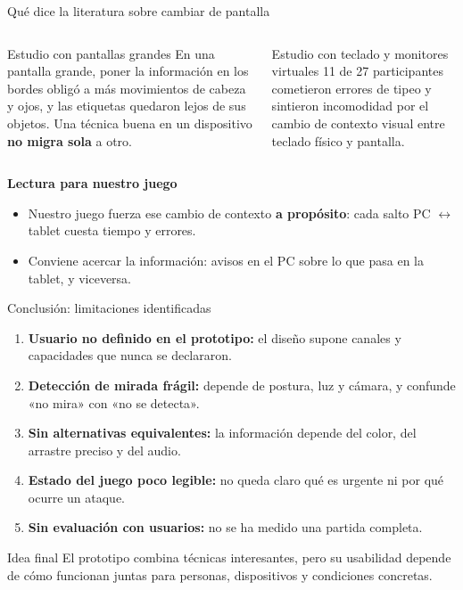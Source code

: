 \documentclass[aspectratio=169,11pt]{beamer}
\newcommand{\tagline}[1]{{\color{Teal}\bfseries\small #1}}
\newcommand{\strong}[1]{{\color{Navy}\bfseries #1}}
\begin{document}
\begin{frame}{Qué dice la literatura sobre cambiar de pantalla}
  \begin{columns}[T,onlytextwidth]
      \begin{block}{Estudio con pantallas grandes}
        \small
        En una pantalla grande, poner la información en los bordes obligó a más movimientos de cabeza y ojos, y las etiquetas quedaron lejos de sus objetos. Una técnica buena en un dispositivo \strong{no migra sola} a otro.
      \end{block}
      \begin{block}{Estudio con teclado y monitores virtuales}
        \small
        11 de 27 participantes cometieron errores de tipeo y sintieron incomodidad por el cambio de contexto visual entre teclado físico y pantalla.
      \end{block}
  \end{columns}
  \vspace{.5em}
  \tagline{Lectura para nuestro juego}
  \begin{itemize}
    \item Nuestro juego fuerza ese cambio de contexto \strong{a propósito}: cada salto PC $\leftrightarrow$ tablet cuesta tiempo y errores.
    \item Conviene acercar la información: avisos en el PC sobre lo que pasa en la tablet, y viceversa.
  \end{itemize}
\end{frame}

\begin{frame}{Conclusión: limitaciones identificadas}
  \begin{enumerate}
    \item \strong{Usuario no definido en el prototipo:} el diseño supone canales y capacidades que nunca se declararon.
    \item \strong{Detección de mirada frágil:} depende de postura, luz y cámara, y confunde «no mira» con «no se detecta».
    \item \strong{Sin alternativas equivalentes:} la información depende del color, del arrastre preciso y del audio.
    \item \strong{Estado del juego poco legible:} no queda claro qué es urgente ni por qué ocurre un ataque.
    \item \strong{Sin evaluación con usuarios:} no se ha medido una partida completa.
  \end{enumerate}
  \vspace{.5em}
  \begin{block}{Idea final}
    El prototipo combina técnicas interesantes, pero su usabilidad depende de cómo funcionan juntas para personas, dispositivos y condiciones concretas.
  \end{block}
\end{frame}
\end{document}
